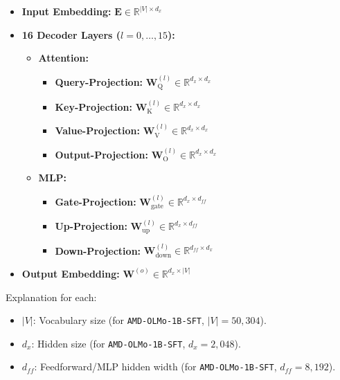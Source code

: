\begin{itemize}
    \item \textbf{Input Embedding:} $\mathbf{E} \in \mathbb{R}^{|V| \times d_x}$
    \item \textbf{16 Decoder Layers ($l = 0, \ldots, 15$):}
    \begin{itemize}
        \item \textbf{Attention:}
        \begin{itemize}
            \item \textbf{Query-Projection:} \hspace{0.6em} $\mathbf{W}_\text{Q}^{(l)} \in \mathbb{R}^{d_x \times d_x}$
            \item \textbf{Key-Projection:} \hspace{1.8em} $\mathbf{W}_\text{K}^{(l)} \in \mathbb{R}^{d_x \times d_x}$
            \item \textbf{Value-Projection:} \hspace{1.3em} $\mathbf{W}_\text{V}^{(l)} \in \mathbb{R}^{d_x \times d_x}$
            \item \textbf{Output-Projection:} \hspace{0.5em} $\mathbf{W}_\text{O}^{(l)} \in \mathbb{R}^{d_x \times d_x}$
        \end{itemize}
        \item \textbf{MLP:}
        \begin{itemize}
            \item \textbf{Gate-Projection:} \hspace{1.7em} $\mathbf{W}_\text{gate}^{(l)} \in \mathbb{R}^{d_x \times d_{ff}}$
            \item \textbf{Up-Projection:} \hspace{2.3em} $\mathbf{W}_\text{up}^{(l)} \in \mathbb{R}^{d_x \times d_{ff}}$
            \item \textbf{Down-Projection:} \hspace{1.2em} $\mathbf{W}_\text{down}^{(l)} \in \mathbb{R}^{d_{ff} \times d_x}$
        \end{itemize}
    \end{itemize}
    \item \textbf{Output Embedding:} $\mathbf{W}^{(o)} \in \mathbb{R}^{d_x \times |V|}$
\end{itemize}

Explanation for each:

\begin{itemize}
\item $|V|$: Vocabulary size (for \texttt{AMD-OLMo-1B-SFT}, $|V| = 50{,}304$).
\item $d_x$: Hidden size (for \texttt{AMD-OLMo-1B-SFT}, $d_x = 2{,}048$).
\item $d_{ff}$: Feedforward/MLP hidden width (for \texttt{AMD-OLMo-1B-SFT}, $d_{ff} = 8{,}192$).
\end{itemize}


